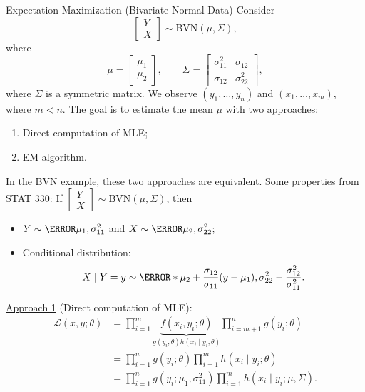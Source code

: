 \begin{Example}{Expectation-Maximization (Bivariate Normal Data)}
    Consider
    \[ \begin{bmatrix}
            Y \\
            X
        \end{bmatrix}
        \sim \text{BVN}(\mu,\Sigma), \]
    where
    \[ \mu=\begin{bmatrix}
            \mu_1 \\
            \mu_2
        \end{bmatrix},\qquad
        \Sigma=\begin{bmatrix}
            \sigma_{11}^2 & \sigma_{12}   \\
            \sigma_{12}   & \sigma_{22}^2
        \end{bmatrix}, \]
    where $ \Sigma $ is a symmetric matrix. We observe
    $ (y_1,\ldots,y_n) $ and $ (x_1,\ldots,x_m) $,
    where $ m<n $. The goal is to estimate the mean $ \mu $
    with two approaches:
    \begin{enumerate}[(1)]
        \item Direct computation of MLE\@;
        \item EM algorithm.
    \end{enumerate}
    In the BVN example, these two approaches are equivalent.
    Some properties from STAT 330: If $ \begin{bmatrix}
            Y \\
            X
        \end{bmatrix}\sim \text{BVN}(\mu,\Sigma) $, then
    \begin{itemize}
        \item $ Y \sim \N{\mu_1,\sigma_{11}^2} $ and $ X \sim \N{\mu_2,\sigma_{22}^2} $;
        \item Conditional distribution:
              \[ X\mid Y=y \sim \N*{\mu_2+
                      \frac{\sigma_{12}}{\sigma_{11}}(y-\mu_1),
                      \sigma_{22}^2-\frac{\sigma_{12}^2}{\sigma_{11}^2}}. \]

    \end{itemize}
    \underline{Approach 1} (Direct computation of MLE):
    \begin{align*}
        \mathcal{L}(x,y;\theta)
         & =\prod_{i=1}^m \underbrace{f(x_i,y_i;\theta)}_{g(y_i;\theta)h(x_i\mid y_i;\theta)}
        \prod_{i=m+1}^{n}g(y_i;\theta)                                                        \\
         & =\prod_{i=1}^n g(y_i;\theta)\prod_{i=1}^{m}h(x_i\mid y_i;\theta)                   \\
         & =\prod_{i=1}^n g(y_i;\mu_1,\sigma_{11}^2)
        \prod_{i=1}^m h(x_i\mid y_i;\mu,\Sigma).
    \end{align*}
\end{Example}
